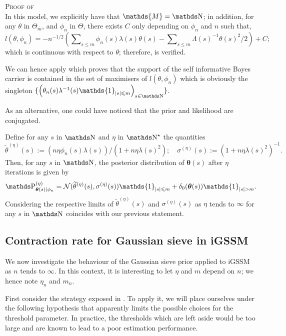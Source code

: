 \begin{pro}{\textsc{Proof of } \\}\label{PRO_BAYES_GAUSS_SELFINFORM}
In this model, we explicitly have that $\mathds{M} = \N$; in addition, for any $\theta$ in $\Theta_{\overline{m}}$, and $\phi_{n}$ in $\Theta$, there exists $C$ only depending on $\phi_{n}$ and $n$ such that,
\[l(\theta, \phi_{n}) = -n^{-1/2}\left(\sum\nolimits_{s \leq m} \phi_{n}(s) \lambda(s) \theta(s) - \sum\nolimits_{s \leq m} \Lambda(s)^{-1} \theta(s)^{2}/2 \right) + C;\]
which is continuous with respect to $\theta$; therefore,  is verified.

We can hence apply  which proves that the support of the self informative Bayes carrier is contained in the set of maximisers of $l(\theta, \phi_{n})$ which is obviously the singleton $\{\left(\theta_{n}(s)\lambda^{-1}(s) \mathds{1}_{\vert s \vert \leq m}\right)_{s \in \N}\}$.
\proEnd
\end{pro}

As an alternative, one could have noticed that the prior and likelihood are conjugated.

Define for any $s$ in $\N$ and $\eta$ in $\N^{\star}$ the quantities
\[\widetilde{\theta}^{(\eta)}(s) := (n \eta \phi_{n}(s) \lambda(s))/(1 + n \eta \lambda(s)^{2}); \quad \sigma^{(\eta)}(s) := (1 + n \eta \lambda(s)^{2})^{-1}.\]
Then, for any $s$ in $\N$, the posterior distribution of $\boldsymbol{\theta}(s)$ after $\eta$ iterations is given by
\[\P_{\boldsymbol{\theta}(s) \vert \phi_{n}}^{(\eta)} = \mathcal{N}(\widetilde{\theta}^{(\eta)}(s), \sigma^{(\eta)}(s)) \mathds{1}_{\vert s \vert \leq m} + \delta_{0}(\boldsymbol{\theta}(s)) \mathds{1}_{\vert s \vert > m}.\]
Considering the respective limits of $\widetilde{\theta}^{(\eta)}(s)$ and $\sigma^{(\eta)}(s)$ as $\eta$ tends to $\infty$ for any $s$ in $\N$ coincides with our previous statement.

\subsection{Contraction rate for Gaussian sieve in iGSSM}\label{BAYES_GAUSS_CONTRACT}
We now investigate the behaviour of the Gaussian sieve prior applied to iGSSM as $n$ tends to $\infty$.
In this context, it is interesting to let $\eta$ and $m$ depend on $n$; we hence note $\eta_{n}$ and $m_{n}$.

\medskip

First consider the strategy exposed in .
To apply it, we will place ourselves under the following hypothesis that apparently limits the possible choices for the threshold parameter.
In practice, the thresholds which are left aside would be too large and are known to lead to a poor estimation performance.

